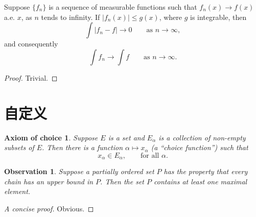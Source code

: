 \begin{theorem}
    Suppose $\{f_n\}$ is a sequence of measurable functions such that
    $f_n(x) \to f(x)$ a.e. $x$, as $n$ tends to infinity.
    If $|f_n(x)| \le g(x)$, where $g$ is integrable, then
    \begin{equation}
        \int |f_n - f| \to 0 \qquad \text{as } n \to \infty,
    \end{equation}
    and consequently
    \begin{equation}
        \int f_n \to \int f \qquad \text{as } n \to \infty.
    \end{equation}
\end{theorem}

\begin{proof}
    Trivial.
\end{proof}



\section{自定义}

\newtheorem*{axiomofchoice}{Axiom of choice}
\begin{axiomofchoice}
    Suppose $E$ is a set and ${E_\alpha}$ is a collection of
    non-empty subsets of $E$. Then there is a function $\alpha
    \mapsto x_\alpha$ (a ``choice function'') such that
    \begin{equation}
        x_\alpha \in E_\alpha,\qquad \text{for all }\alpha.
    \end{equation}
\end{axiomofchoice}

\newtheorem{observation}{Observation}
\begin{observation}
    Suppose a partially ordered set $P$ has the property
    that every chain has an upper bound in $P$. Then the
    set $P$ contains at least one maximal element.
\end{observation}
\begin{proof}[A concise proof]
    Obvious.
\end{proof}
